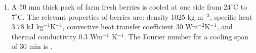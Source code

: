 \documentclass[a4paper,10pt]{article}
\begin{document}
\begin{enumerate}
    \hfill{}
    
    \item A $50$ mm thick pack of farm fresh berries is cooled at one side from $24^\circ$C to $7^\circ$C. The relevant properties of berries are: density $1025$ kg m$^{-3}$, specific heat $3.78$ kJ kg$^{-1}$K$^{-1}$, convective heat transfer coefficient $30$ Wm$^{-2}$K$^{-1}$, and thermal conductivity $0.3$ Wm$^{-1}$ K$^{-1}$. The Fourier number for a cooling span of $30$ min is \underline{\hspace{2cm}}.
    
    \hfill{}
\end{enumerate}
\end{document}

